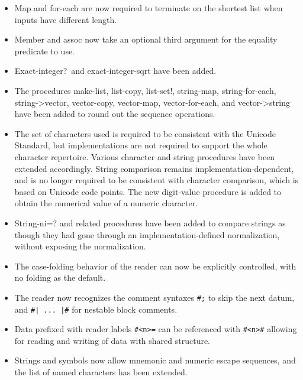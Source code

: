 \begin{itemize}
\item {\cf Map} and {\cf for-each} are now required to terminate on
the shortest list when inputs have different length.

\item {\cf Member} and {\cf assoc} now take an optional third argument
for the equality predicate to use.

\item {\cf Exact-integer?}\  and {\cf exact-integer-sqrt} have been added.

\item The procedures {\cf make-list}, {\cf list-copy}, {\cf list-set!}, {\cf
string-map}, {\cf string-for-each}, {\cf string->vector}, {\cf
vector-copy}, {\cf vector-map}, {\cf vector-for-each}, and {\cf
vector->string} have been added to round out the sequence operations.

\item The set of characters used is required to be consistent with the
Unicode Standard, 
but implementations are not required to support the whole character repertoire.
Various character and string procedures have been extended accordingly.
String comparison remains implementation-dependent, and is no longer
required to be consistent with character comparison, which is based
on Unicode code points.
The new {\cf digit-value} procedure is added to obtain the numerical
value of a numeric character.

\item {\cf String-ni=?} and related procedures have been added to
compare strings as though they had gone through an
implementation-defined normalization, without exposing the
normalization.

\item The case-folding behavior of the reader can now be explicitly
controlled, with no folding as the default.

\item The reader now recognizes the comment syntaxes {\tt \#;} to
skip the next datum, and {\tt \#| ... |\#}
for nestable block comments.

\item Data prefixed with reader labels {\tt \#<n>=} can be referenced
with {\tt \#<n>\#} allowing for reading and writing of data with
shared structure.

\item Strings and symbols now allow mnemonic and numeric escape
sequences, and the list of named characters has been extended.


\end{itemize}
